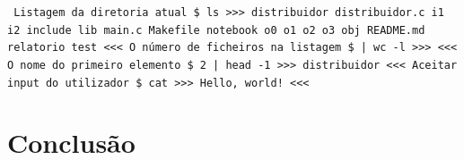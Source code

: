 \documentclass[12pt]{report}
\begin{document}
\texttt{
\newline Listagem da diretoria atual
\newline \$ ls
\newline >>>
\newline distribuidor \newline distribuidor.c \newline i1 \newline i2
\newline include \newline lib \newline main.c \newline Makefile
\newline notebook \newline o0 \newline o1 \newline o2 \newline o3
\newline obj \newline README.md \newline relatorio \newline test
\newline <<<
\newline O número de ficheiros na listagem
\newline \$ | wc -l
\newline >>>
\newline <<<
\newline O nome do primeiro elemento
\newline \$ 2 | head -1
\newline >>>
\newline distribuidor
\newline <<<
\newline Aceitar input do utilizador
\newline \$ cat
\newline >>>
\newline Hello, world!
\newline <<<
\newline
}

\chapter{Conclusão}
\label{sec:conclusao}
\end{document}
